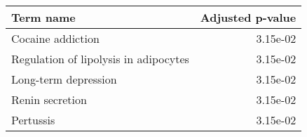 \begin{tabular}{lr}
\toprule
                             Term name &  Adjusted p-value \\
\midrule
                     Cocaine addiction &          3.15e-02 \\
 Regulation of lipolysis in adipocytes &          3.15e-02 \\
                  Long-term depression &          3.15e-02 \\
                       Renin secretion &          3.15e-02 \\
                             Pertussis &          3.15e-02 \\
\bottomrule
\end{tabular}
